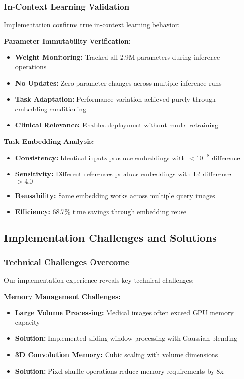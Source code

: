 \subsubsection*{In-Context Learning Validation}
Implementation confirms true in-context learning behavior:

\textbf{Parameter Immutability Verification:}
\begin{itemize}
    \item \textbf{Weight Monitoring:} Tracked all 2.9M parameters during inference operations
    \item \textbf{No Updates:} Zero parameter changes across multiple inference runs
    \item \textbf{Task Adaptation:} Performance variation achieved purely through embedding conditioning
    \item \textbf{Clinical Relevance:} Enables deployment without model retraining
\end{itemize}

\textbf{Task Embedding Analysis:}
\begin{itemize}
    \item \textbf{Consistency:} Identical inputs produce embeddings with $<10^{-8}$ difference
    \item \textbf{Sensitivity:} Different references produce embeddings with L2 difference $>4.0$
    \item \textbf{Reusability:} Same embedding works across multiple query images
    \item \textbf{Efficiency:} 68.7\% time savings through embedding reuse
\end{itemize}

\subsection{Implementation Challenges and Solutions}

\subsubsection*{Technical Challenges Overcome}
Our implementation experience reveals key technical challenges:

\textbf{Memory Management Challenges:}
\begin{itemize}
    \item \textbf{Large Volume Processing:} Medical images often exceed GPU memory capacity
    \item \textbf{Solution:} Implemented sliding window processing with Gaussian blending
    \item \textbf{3D Convolution Memory:} Cubic scaling with volume dimensions
    \item \textbf{Solution:} Pixel shuffle operations reduce memory requirements by 8x
\end{itemize}

